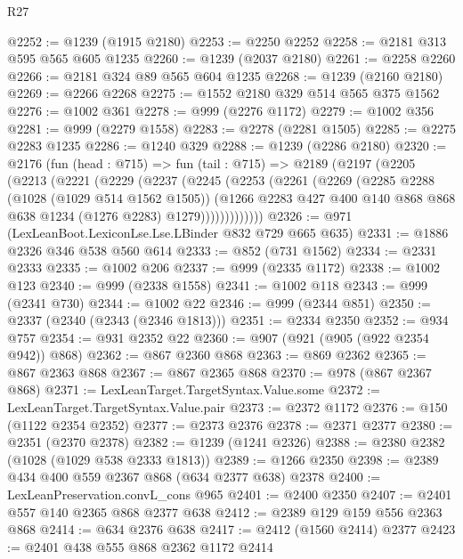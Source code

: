 \begin{lexlean}{R27}
\begin{coremodule}
@2252 := @1239 (@1915 @2180)
@2253 := @2250 @2252
@2258 := @2181 @313 @595 @565 @605 @1235
@2260 := @1239 (@2037 @2180)
@2261 := @2258 @2260
@2266 := @2181 @324 @89 @565 @604 @1235
@2268 := @1239 (@2160 @2180)
@2269 := @2266 @2268
@2275 := @1552 @2180 @329 @514 @565 @375 @1562
@2276 := @1002 @361
@2278 := @999 (@2276 @1172)
@2279 := @1002 @356
@2281 := @999 (@2279 @1558)
@2283 := @2278 (@2281 @1505)
@2285 := @2275 @2283 @1235
@2286 := @1240 @329
@2288 := @1239 (@2286 @2180)
@2320 := @2176
    (fun (head : @715) =>
    fun (tail : @715) =>
    @2189
      (@2197
        (@2205
          (@2213
            (@2221
              (@2229
                (@2237
                  (@2245
                    (@2253
                      (@2261
                        (@2269
                          (@2285
                            @2288
                            (@1028 (@1029 @514 @1562 @1505))
                            (@1266
                              @2283
                              @427
                              @400
                              @140
                              @868
                              @868
                              @638
                              @1234
                              (@1276 @2283)
                              @1279)))))))))))))
@2326 := @971 (LexLeanBoot.LexiconLse.Lse.LBinder @832 @729 @665 @635)
@2331 := @1886 @2326 @346 @538 @560 @614
@2333 := @852 (@731 @1562)
@2334 := @2331 @2333
@2335 := @1002 @206
@2337 := @999 (@2335 @1172)
@2338 := @1002 @123
@2340 := @999 (@2338 @1558)
@2341 := @1002 @118
@2343 := @999 (@2341 @730)
@2344 := @1002 @22
@2346 := @999 (@2344 @851)
@2350 := @2337 (@2340 (@2343 (@2346 @1813)))
@2351 := @2334 @2350
@2352 := @934 @757
@2354 := @931 @2352 @22
@2360 := @907 (@921 (@905 (@922 @2354 @942)) @868)
@2362 := @867 @2360 @868
@2363 := @869 @2362
@2365 := @867 @2363 @868
@2367 := @867 @2365 @868
@2370 := @978 (@867 @2367 @868)
@2371 := LexLeanTarget.TargetSyntax.Value.some
@2372 := LexLeanTarget.TargetSyntax.Value.pair
@2373 := @2372 @1172
@2376 := @150 (@1122 @2354 @2352)
@2377 := @2373 @2376
@2378 := @2371 @2377
@2380 := @2351 (@2370 @2378)
@2382 := @1239 (@1241 @2326)
@2388 := @2380 @2382 (@1028 (@1029 @538 @2333 @1813))
@2389 := @1266 @2350
@2398 := @2389 @434 @400 @559 @2367 @868 (@634 @2377 @638) @2378
@2400 := LexLeanPreservation.convL_cons @965
@2401 := @2400 @2350
@2407 := @2401 @557 @140 @2365 @868 @2377 @638
@2412 := @2389 @129 @159 @556 @2363 @868
@2414 := @634 @2376 @638
@2417 := @2412 (@1560 @2414) @2377
@2423 := @2401 @438 @555 @868 @2362 @1172 @2414

\end{coremodule}
\end{lexlean}
